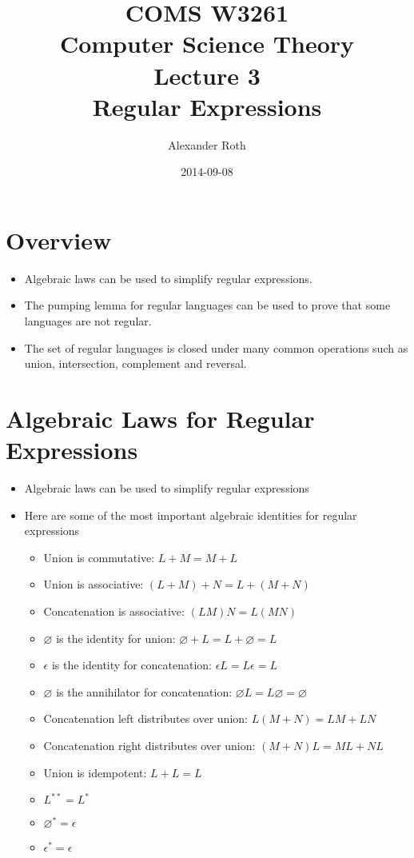 \documentclass[]{article}
\begin{document}
\title{COMS W3261 \\ Computer Science Theory \\ Lecture 3\\ Regular Expressions}
\author{Alexander Roth}
\date{2014-09-08}
\maketitle

\section*{Overview}
  \begin{itemize}
    \item Algebraic laws can be used to simplify regular expressions.
    \item The pumping lemma for regular languages can be used to prove that some
    languages are not regular.
    \item The set of regular languages is closed under many common operations
    such as union, intersection, complement and reversal.
  \end{itemize}

\section{Algebraic Laws for Regular Expressions}
  \begin{itemize}
    \item Algebraic laws can be used to simplify regular expressions
    \item Here are some of the most important algebraic identities for regular
    expressions
      \begin{itemize}
        \item Union is commutative: $L + M = M + L$
        \item Union is associative: $(L + M) + N = L + (M + N)$
        \item Concatenation is associative: $(LM)N = L(MN)$
        \item $\varnothing$ is the identity for union: $\varnothing + L = L +
        \varnothing = L$
        \item $\epsilon$ is the identity for concatenation: $\epsilon{L} = L
        \epsilon = L$
        \item $\varnothing$ is the annihilator for concatenation: $
        \varnothing{L} = L\varnothing = \varnothing$
        \item Concatenation left distributes over union: $L(M + N) = LM + LN$
        \item Concatenation right distributes over union: $(M + N)L = ML + NL$
        \item Union is idempotent: $L + L = L$
        \item $L^{**} = L^*$
        \item $\varnothing^{*} = \epsilon$
        \item $\epsilon^* = \epsilon$
      \end{itemize}
  \end{itemize}
\end{document}
